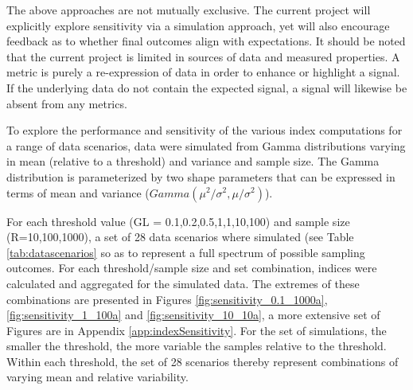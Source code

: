 The above approaches are not mutually exclusive.  The current project will explicitly explore
sensitivity via a simulation approach, yet will also encourage feedback as to whether final outcomes
align with expectations.  It should be noted that the current project is limited in sources of data
and measured properties.  A metric is purely a re-expression of data in order to enhance or
highlight a signal.  If the underlying data do not contain the expected signal, a signal will
likewise be absent from any metrics.

To explore the performance and sensitivity of the various index computations for a range of data
scenarios, data were simulated from Gamma distributions varying in mean (relative to a threshold)
and variance and sample size.  The Gamma distribution is parameterized by two shape parameters that
can be expressed in terms of mean and variance ($Gamma(\mu^2/\sigma^2, \mu/\sigma^2)$).

For each threshold value (GL = {0.1,0.2,0.5,1,1,10,100}) and sample size (R={10,100,1000}), a set of
28 data scenarios where simulated (see Table \ref{tab:datascenarios} so as to represent a full
spectrum of possible sampling outcomes.  For each threshold/sample size and set combination, indices
were calculated and aggregated for the simulated data.  The extremes of these combinations are
presented in Figures \ref{fig:sensitivity_0.1_1000a}, \ref{fig:sensitivity_1_100a} and
\ref{fig:sensitivity_10_10a}, a more extensive set of Figures are in Appendix
\ref{app:indexSensitivity}.  For the set of simulations, the smaller the threshold, the more
variable the samples relative to the threshold.  Within each threshold, the set of 28 scenarios
thereby represent combinations of varying mean and relative variability.


